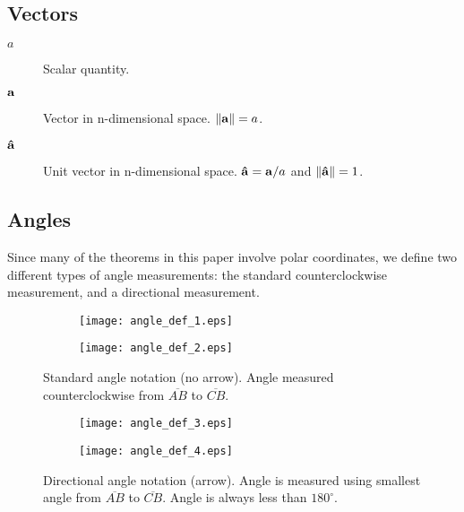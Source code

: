 \subsection{Vectors}

\begin{description}
  \item[$a$] Scalar quantity.
  \item[$\mathbf{a}$] Vector in n-dimensional space. $\norm{\bvec{a}} = a$.
  \item[$\mathbf{\hat{a}}$] Unit vector in n-dimensional space. $\mathbf{\hat{a}} = \mathbf{a}/a$ and $\norm{\bhat{a}} = 1$.
\end{description}

\subsection{Angles}

Since many of the theorems in this paper involve polar coordinates, we define two different types of angle measurements: the standard counterclockwise measurement, and a directional measurement.

\begin{figure}[H]
  \centering
  \begin{subfigure}[b]{0.4\textwidth}
    \texttt{[image: angle\_def\_1.eps]}
    \caption{}
    \label{fig:angle-def-1}
  \end{subfigure}
  \qquad \qquad
  \begin{subfigure}[b]{0.4\textwidth}
    \texttt{[image: angle\_def\_2.eps]}
    \caption{}
    \label{fig:angle-def-2}
  \end{subfigure}
  \caption{Standard angle notation (no arrow). Angle measured counterclockwise from $\overline{AB}$ to $\overline{CB}$.}
\end{figure}

\begin{figure}[H]
  \begin{subfigure}[b]{0.4\textwidth}
    \texttt{[image: angle\_def\_3.eps]}
    \caption{}
    \label{fig:angle-def-3}
  \end{subfigure}
  \qquad \qquad
  \begin{subfigure}[b]{0.4\textwidth}
    \texttt{[image: angle\_def\_4.eps]}
    \caption{}
    \label{fig:angle-def-4}
  \end{subfigure}
  \caption{Directional angle notation (arrow). Angle is measured using smallest angle from $\overline{AB}$ to $\overline{CB}$. Angle is always less than $180^{\circ}$.}
\end{figure}